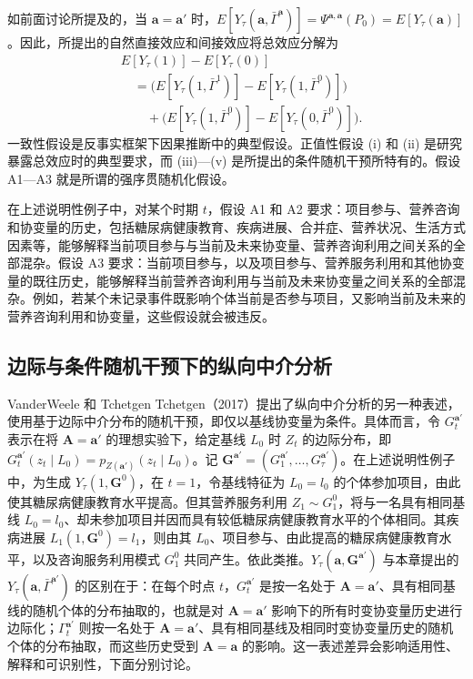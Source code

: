 如前面讨论所提及的，当 $\mathbf a=\mathbf a'$ 时，$E[Y_\tau(\mathbf a,\bar\Gamma^{\mathbf a})]=\Psi^{\mathbf a,\mathbf a}(P_0)=E[Y_\tau(\mathbf a)]$。因此，所提出的自然直接效应和间接效应将总效应分解为
\[
\begin{aligned}
 &E[Y_\tau(1)]-E[Y_\tau(0)]\\
 &\quad=\bigl(E[Y_\tau(1,\bar\Gamma^1)]-E[Y_\tau(1,\bar\Gamma^0)]\bigr)\\
 &\qquad{}+\bigl(E[Y_\tau(1,\bar\Gamma^0)]-E[Y_\tau(0,\bar\Gamma^0)]\bigr).
\end{aligned}
\]
一致性假设是反事实框架下因果推断中的典型假设。正值性假设 (i) 和 (ii) 是研究暴露总效应时的典型要求，而 (iii)—(v) 是所提出的条件随机干预所特有的。假设 A1—A3 就是所谓的强序贯随机化假设。

在上述说明性例子中，对某个时期 $t$，假设 A1 和 A2 要求：项目参与、营养咨询和协变量的历史，包括糖尿病健康教育、疾病进展、合并症、营养状况、生活方式因素等，能够解释当前项目参与与当前及未来协变量、营养咨询利用之间关系的全部混杂。假设 A3 要求：当前项目参与，以及项目参与、营养服务利用和其他协变量的既往历史，能够解释当前营养咨询利用与当前及未来协变量之间关系的全部混杂。例如，若某个未记录事件既影响个体当前是否参与项目，又影响当前及未来的营养咨询利用和协变量，这些假设就会被违反。

\subsection{边际与条件随机干预下的纵向中介分析}

VanderWeele 和 Tchetgen Tchetgen（2017）提出了纵向中介分析的另一种表述，使用基于边际中介分布的随机干预，即仅以基线协变量为条件。具体而言，令 $G_t^{\mathbf a'}$ 表示在将 $\mathbf A=\mathbf a'$ 的理想实验下，给定基线 $L_0$ 时 $Z_t$ 的边际分布，即 $G_t^{\mathbf a'}(z_t\mid L_0)=p_{Z(\mathbf a')}(z_t\mid L_0)$。记 $\mathbf G^{\mathbf a'}=(G_1^{\mathbf a'},\ldots,G_\tau^{\mathbf a'})$。在上述说明性例子中，为生成 $Y_\tau(1,\mathbf G^0)$，在 $t=1$，令基线特征为 $L_0=l_0$ 的个体参加项目，由此使其糖尿病健康教育水平提高。但其营养服务利用 $Z_1\sim G_1^0$，将与一名具有相同基线 $L_0=l_0$、却未参加项目并因而具有较低糖尿病健康教育水平的个体相同。其疾病进展 $L_1(1,\mathbf G^0)=l_1$，则由其 $L_0$、项目参与、由此提高的糖尿病健康教育水平，以及咨询服务利用模式 $G_1^0$ 共同产生。依此类推。$Y_\tau(\mathbf a,\mathbf G^{\mathbf a'})$ 与本章提出的 $Y_\tau(\mathbf a,\bar\Gamma^{\mathbf a'})$ 的区别在于：在每个时点 $t$，$G_t^{\mathbf a'}$ 是按一名处于 $\mathbf A=\mathbf a'$、具有相同基线的随机个体的分布抽取的，也就是对 $\mathbf A=\mathbf a'$ 影响下的所有时变协变量历史进行边际化；$\Gamma_t^{\mathbf a'}$ 则按一名处于 $\mathbf A=\mathbf a'$、具有相同基线及相同时变协变量历史的随机个体的分布抽取，而这些历史受到 $\mathbf A=\mathbf a$ 的影响。这一表述差异会影响适用性、解释和可识别性，下面分别讨论。

